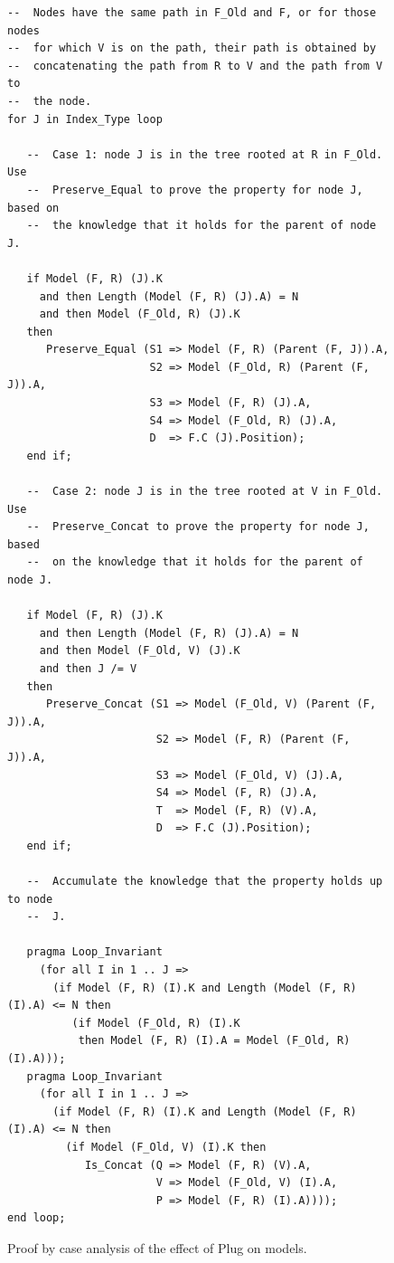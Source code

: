 \documentclass{llncs}
\begin{document}
\begin{figure}
\begin{small}
\begin{lstlisting}
--  Nodes have the same path in F_Old and F, or for those nodes
--  for which V is on the path, their path is obtained by
--  concatenating the path from R to V and the path from V to
--  the node.
for J in Index_Type loop

   --  Case 1: node J is in the tree rooted at R in F_Old. Use
   --  Preserve_Equal to prove the property for node J, based on
   --  the knowledge that it holds for the parent of node J.

   if Model (F, R) (J).K
     and then Length (Model (F, R) (J).A) = N
     and then Model (F_Old, R) (J).K
   then
      Preserve_Equal (S1 => Model (F, R) (Parent (F, J)).A,
                      S2 => Model (F_Old, R) (Parent (F, J)).A,
                      S3 => Model (F, R) (J).A,
                      S4 => Model (F_Old, R) (J).A,
                      D  => F.C (J).Position);
   end if;

   --  Case 2: node J is in the tree rooted at V in F_Old. Use
   --  Preserve_Concat to prove the property for node J, based
   --  on the knowledge that it holds for the parent of node J.

   if Model (F, R) (J).K
     and then Length (Model (F, R) (J).A) = N
     and then Model (F_Old, V) (J).K
     and then J /= V
   then
      Preserve_Concat (S1 => Model (F_Old, V) (Parent (F, J)).A,
                       S2 => Model (F, R) (Parent (F, J)).A,
                       S3 => Model (F_Old, V) (J).A,
                       S4 => Model (F, R) (J).A,
                       T  => Model (F, R) (V).A,
                       D  => F.C (J).Position);
   end if;

   --  Accumulate the knowledge that the property holds up to node
   --  J.

   pragma Loop_Invariant
     (for all I in 1 .. J =>
       (if Model (F, R) (I).K and Length (Model (F, R) (I).A) <= N then
          (if Model (F_Old, R) (I).K
           then Model (F, R) (I).A = Model (F_Old, R) (I).A)));
   pragma Loop_Invariant
     (for all I in 1 .. J =>
       (if Model (F, R) (I).K and Length (Model (F, R) (I).A) <= N then
         (if Model (F_Old, V) (I).K then
            Is_Concat (Q => Model (F, R) (V).A,
                       V => Model (F_Old, V) (I).A,
                       P => Model (F, R) (I).A))));
end loop;
\end{lstlisting}
\end{small}
\caption{\label{fig-proof-ca} Proof by case analysis of the effect of Plug on models.}
\end{figure}
\end{document}
